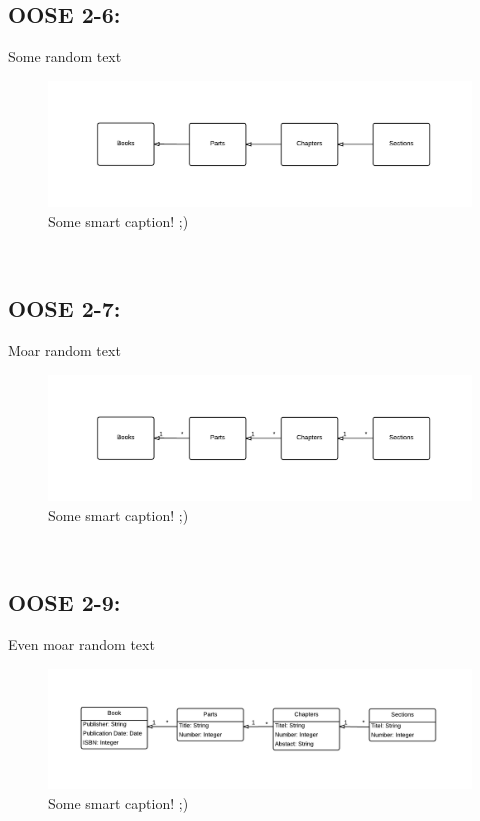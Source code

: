 \documentclass[11pt,a4paper]{article}
\begin{document}
\subsection{OOSE 2-6:}
Some random text \\
\begin{figure}[h!]
    \centering
    \includegraphics[width=1.1\textwidth]{pictures/oose2_6}
    \caption{Some smart caption! ;)}
    \label{fig:OOSE26}
\end{figure}
\\

\subsection{OOSE 2-7:}
Moar random text \\
\begin{figure}[h!]
    \centering
    \includegraphics[width=1.1\textwidth]{pictures/oose2_7}
    \caption{Some smart caption! ;)}
    \label{fig:OOSE27}
\end{figure}
\\

\newpage
\subsection{OOSE 2-9:}
Even moar random text \\
\begin{figure}[h!]
    \centering
    \includegraphics[width=1.1\textwidth]{pictures/oose2_9}
    \caption{Some smart caption! ;)}
    \label{fig:OOSE29}
\end{figure}
\\
\end{document}
